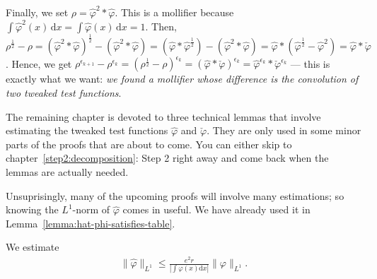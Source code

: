 Finally, we set \(\rho = \hat \varphi^2 * \hat \varphi\). This is a mollifier because \(\int \hat \varphi^2(x) \, \mathrm{d}x = \int \hat \varphi(x)  \, \mathrm{d}x = 1\).  Then, \(\rho^{\frac{1}{2}} - \rho = (\hat \varphi^2 * \hat \varphi)^{\frac{1}{2}} - (\hat \varphi^2 * \hat \varphi) = (\hat \varphi * \hat \varphi^{\frac{1}{2}})- (\hat \varphi^2 * \hat \varphi) = \hat \varphi * (\hat \varphi^{\frac{1}{2}} - \hat \varphi^{2}) = \hat \varphi * \check \varphi\). Hence, we get \(\rho^{\epsilon_{k+1}} - \rho^{\epsilon_k} = (\rho^{\frac{1}{2}} - \rho)^{\epsilon_k} = (\hat \varphi * \check \varphi)^{\epsilon_k} = \hat \varphi^{\epsilon_k} * \check \varphi^{\epsilon_k}\) --- this is exactly what we want: \emph{we found a mollifier whose difference is the convolution of two tweaked test functions}.

The remaining chapter is devoted to three technical lemmas that involve estimating the tweaked test functions \(\hat \varphi\) and \(\check \varphi\). They are only used in some minor parts of the proofs that are about to come. You can either skip to chapter~\ref{step2:decomposition}: Step 2 right away and come back when the lemmas are actually needed.

Unsuprisingly, many of the upcoming proofs will involve many estimations; so knowing the \(L^1\)-norm of \(\hat \varphi\) comes in useful. We have already used it in Lemma~\ref{lemma:hat-phi-satisfies-table}.
\begin{lemma}\label{lemma:tweaked-l1-norm}
We estimate
\begin{align}\label{tweaked-l1-norm}
    \lVert \hat \varphi \rVert_{L^1} \leq \frac{e^2 r}{|\int \varphi(x) \mathrm{d}x |} \lVert \varphi \rVert_{L^1}.
\end{align}
\end{lemma}

